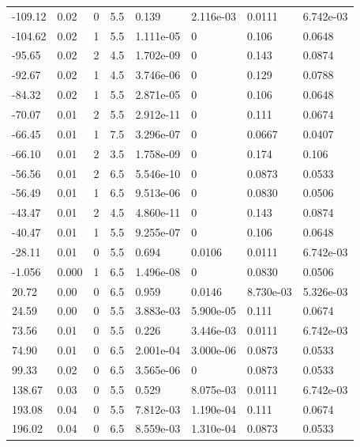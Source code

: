 \documentclass[preview]{standalone}
\begin{document}
{{\begin{tabular}{L{1.2cm}C{1.2cm} C{0.3cm}C{0.5cm} C{1.4cm}C{1.4cm} C{1.4cm}C{1.4cm}}
  -109.12  &  0.02  & 0     & 5.5 &  0.139  & 2.116e-03  & 0.0111 &  6.742e-03   \\ 
  -104.62  &  0.02  & 1     & 5.5 &  1.111e-05  & 0  & 0.106 &  0.0648   \\ 
  -95.65  &  0.02  & 2     & 4.5 &  1.702e-09  & 0  & 0.143 &  0.0874   \\ 
  -92.67  &  0.02  & 1     & 4.5 &  3.746e-06  & 0  & 0.129 &  0.0788   \\ 
  -84.32  &  0.02  & 1     & 5.5 &  2.871e-05  & 0  & 0.106 &  0.0648   \\ 
  -70.07  &  0.01  & 2     & 5.5 &  2.912e-11  & 0  & 0.111 &  0.0674   \\ 
  -66.45  &  0.01  & 1     & 7.5 &  3.296e-07  & 0  & 0.0667 &  0.0407   \\ 
  -66.10  &  0.01  & 2     & 3.5 &  1.758e-09  & 0  & 0.174 &  0.106   \\ 
  -56.56  &  0.01  & 2     & 6.5 &  5.546e-10  & 0  & 0.0873 &  0.0533   \\ 
  -56.49  &  0.01  & 1     & 6.5 &  9.513e-06  & 0  & 0.0830 &  0.0506   \\ 
  -43.47  &  0.01  & 2     & 4.5 &  4.860e-11  & 0  & 0.143 &  0.0874   \\ 
  -40.47  &  0.01  & 1     & 5.5 &  9.255e-07  & 0  & 0.106 &  0.0648   \\ 
  -28.11  &  0.01  & 0     & 5.5 &  0.694  & 0.0106  & 0.0111 &  6.742e-03   \\ 
  -1.056  &  0.000  & 1     & 6.5 &  1.496e-08  & 0  & 0.0830 &  0.0506   \\ 
  20.72  &  0.00  & 0     & 6.5 &  0.959  & 0.0146  & 8.730e-03 &  5.326e-03   \\ 
  24.59  &  0.00  & 0     & 5.5 &  3.883e-03  & 5.900e-05  & 0.111 &  0.0674   \\ 
  73.56  &  0.01  & 0     & 5.5 &  0.226  & 3.446e-03  & 0.0111 &  6.742e-03   \\ 
  74.90  &  0.01  & 0     & 6.5 &  2.001e-04  & 3.000e-06  & 0.0873 &  0.0533   \\ 
  99.33  &  0.02  & 0     & 6.5 &  3.565e-06  & 0  & 0.0873 &  0.0533   \\ 
  138.67  &  0.03  & 0     & 5.5 &  0.529  & 8.075e-03  & 0.0111 &  6.742e-03   \\ 
  193.08  &  0.04  & 0     & 5.5 &  7.812e-03  & 1.190e-04  & 0.111 &  0.0674   \\ 
  196.02  &  0.04  & 0     & 6.5 &  8.559e-03  & 1.310e-04  & 0.0873 &  0.0533   \\ 

\end{tabular}}}
\end{document}
